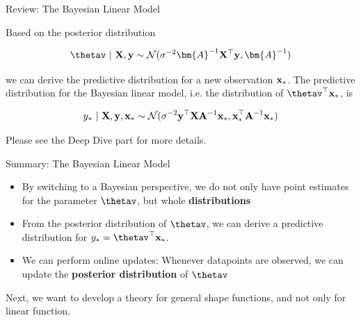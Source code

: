 \documentclass[11pt,compress,t,notes=noshow, xcolor=table]{beamer}
\begin{document}
\begin{vbframe}{Review: The Bayesian Linear Model} 
    
    Based on the posterior distribution 
    
    $$
    \thetav ~|~ \Xmat, \yv \sim \mathcal{N}(\sigma^{-2}\bm{A}^{-1}\Xmat^\top\yv, \bm{A}^{-1})
    $$
    
    we can derive the predictive distribution for a new observation $\mathbf{x}_*$. The predictive distribution for the Bayesian linear model, i.e. the distribution of $\thetav^\top \xv_*$, is 
    
    $$
    y_* ~|~ \mathbf{X}, \mathbf{y}, \mathbf{x}_* \sim \mathcal{N}(\sigma^{-2}\mathbf{y}^\top \mathbf{X} \mathbf{A}^{-1}\mathbf{x}_*, \mathbf{x}_*^\top\mathbf{A}^{-1}\mathbf{x}_*)
    $$ 

    Please see the Deep Dive part for more details.
    
\end{vbframe}



\begin{vbframe}{Summary: The Bayesian Linear Model}

\begin{itemize}
  \item By switching to a Bayesian perspective, we do not only have point estimates for the parameter $\thetav$, but whole \textbf{distributions}
  \item From the posterior distribution of $\thetav$, we can derive a predictive distribution for $y_* = \thetav^\top \xv_*$.  
  \item We can perform online updates: Whenever datapoints are observed, we can update the \textbf{posterior distribution} of $\thetav$
\end{itemize}

Next, we want to develop a theory for general shape functions, and not only for linear function. 

\end{vbframe}
\end{document}
